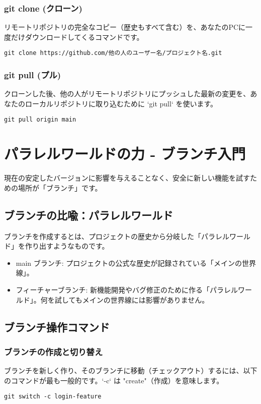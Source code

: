 \documentclass{ltjsarticle}
\begin{document}
\subsubsection{git clone (クローン)}
リモートリポジトリの完全なコピー（歴史もすべて含む）を、あなたのPCに一度だけダウンロードしてくるコマンドです。
\begin{verbatim}
git clone https://github.com/他の人のユーザー名/プロジェクト名.git
\end{verbatim}

\subsubsection{git pull (プル)}
クローンした後、他の人がリモートリポジトリにプッシュした最新の変更を、あなたのローカルリポジトリに取り込むために `git pull` を使います。
\begin{verbatim}
git pull origin main
\end{verbatim}

\section{パラレルワールドの力 - ブランチ入門}
現在の安定したバージョンに影響を与えることなく、安全に新しい機能を試すための場所が「ブランチ」です。

\subsection{ブランチの比喩：パラレルワールド}
ブランチを作成するとは、プロジェクトの歴史から分岐した「パラレルワールド」を作り出すようなものです。
\begin{itemize}
    \item main ブランチ: プロジェクトの公式な歴史が記録されている「メインの世界線」。
    \item フィーチャーブランチ: 新機能開発やバグ修正のために作る「パラレルワールド」。何を試してもメインの世界線には影響がありません。
\end{itemize}

\subsection{ブランチ操作コマンド}
\subsubsection{ブランチの作成と切り替え}
ブランチを新しく作り、そのブランチに移動（チェックアウト）するには、以下のコマンドが最も一般的です。`-c` は "create"（作成）を意味します。
\begin{verbatim}
git switch -c login-feature
\end{verbatim}
\end{document}
